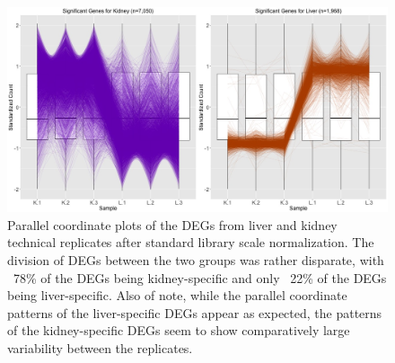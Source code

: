 \documentclass{article}
\begin{document}
\begin{figure}[!p]
\centerline{\includegraphics[width=1\columnwidth]{../Bioinformatics/Pictures/liverKidney/Clustering_data_FDR_001_Raw/Alpha0.1/K_L_Sig.jpg}}
\caption{Parallel coordinate plots of the DEGs from liver and kidney technical replicates after standard library scale normalization. The division of DEGs between the two groups was rather disparate, with ~78\% of the DEGs being kidney-specific and only ~22\% of the DEGs being liver-specific. Also of note, while the parallel coordinate patterns of the liver-specific DEGs appear as expected, the patterns of the kidney-specific DEGs seem to show comparatively large variability between the replicates.
\label{RawKLSig}}
\end{figure}   
\end{document}
